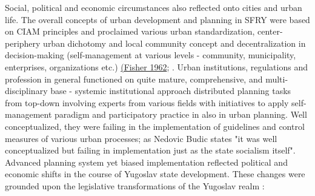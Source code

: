 \documentclass[11pt]{report}
\begin{document}
Social, political and economic circumstances also reflected onto cities and urban life. The overall concepts of urban development and planning in SFRY were based on CIAM principles and proclaimed various urban standardization, center-periphery urban dichotomy and local community concept and decentralization in decision-making (self-management at various levels - community, municipality, enterprises, organizations etc.) \href{ref}{(Fisher 1962}; \citealt{nedovicbudic_waves_2006}. Urban institutions, regulations and profession in general functioned on quite mature, comprehensive, and multi-disciplinary base - systemic institutional approach distributed planning tasks from top-down involving experts from various fields with initiatives to apply self-management paradigm and participatory practice in also in urban planning. Well conceptualized, they were failing in the implementation of guidelines and control measures of various urban processes; as Nedovic Budic \href{ref}{\citealt{nedovic-budic_mornings_2011}} states "it was well conceptualized but failing in implementation just as the state socialism itself".
Advanced planning system yet biased implementation reflected political and economic shifts in the course of Yugoslav state development. These changes were grounded upon the legislative transformations of the Yugoslav realm \href{ref}{\citealt{nedovicbudic_waves_2006}}:
\end{document}
